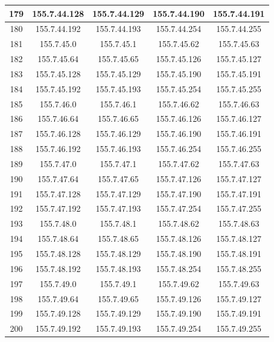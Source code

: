 \documentclass[letterpaper,12pt]{article}
\begin{document}
\begin{longtable}{|c|c|c|c|c|}
        179 & 155.7.44.128 & 155.7.44.129 & 155.7.44.190 & 155.7.44.191 \\ \hline
        180 & 155.7.44.192 & 155.7.44.193 & 155.7.44.254 & 155.7.44.255 \\ \hline
        181 & 155.7.45.0 & 155.7.45.1 & 155.7.45.62 & 155.7.45.63 \\ \hline
        182 & 155.7.45.64 & 155.7.45.65 & 155.7.45.126 & 155.7.45.127 \\ \hline
        183 & 155.7.45.128 & 155.7.45.129 & 155.7.45.190 & 155.7.45.191 \\ \hline
        184 & 155.7.45.192 & 155.7.45.193 & 155.7.45.254 & 155.7.45.255 \\ \hline
        185 & 155.7.46.0 & 155.7.46.1 & 155.7.46.62 & 155.7.46.63 \\ \hline
        186 & 155.7.46.64 & 155.7.46.65 & 155.7.46.126 & 155.7.46.127 \\ \hline
        187 & 155.7.46.128 & 155.7.46.129 & 155.7.46.190 & 155.7.46.191 \\ \hline
        188 & 155.7.46.192 & 155.7.46.193 & 155.7.46.254 & 155.7.46.255 \\ \hline
        189 & 155.7.47.0 & 155.7.47.1 & 155.7.47.62 & 155.7.47.63 \\ \hline
        190 & 155.7.47.64 & 155.7.47.65 & 155.7.47.126 & 155.7.47.127 \\ \hline
        191 & 155.7.47.128 & 155.7.47.129 & 155.7.47.190 & 155.7.47.191 \\ \hline
        192 & 155.7.47.192 & 155.7.47.193 & 155.7.47.254 & 155.7.47.255 \\ \hline
        193 & 155.7.48.0 & 155.7.48.1 & 155.7.48.62 & 155.7.48.63 \\ \hline
        194 & 155.7.48.64 & 155.7.48.65 & 155.7.48.126 & 155.7.48.127 \\ \hline
        195 & 155.7.48.128 & 155.7.48.129 & 155.7.48.190 & 155.7.48.191 \\ \hline
        196 & 155.7.48.192 & 155.7.48.193 & 155.7.48.254 & 155.7.48.255 \\ \hline
        197 & 155.7.49.0 & 155.7.49.1 & 155.7.49.62 & 155.7.49.63 \\ \hline
        198 & 155.7.49.64 & 155.7.49.65 & 155.7.49.126 & 155.7.49.127 \\ \hline
        199 & 155.7.49.128 & 155.7.49.129 & 155.7.49.190 & 155.7.49.191 \\ \hline
        200 & 155.7.49.192 & 155.7.49.193 & 155.7.49.254 & 155.7.49.255 \\ \hline

\end{longtable}
\end{document}
